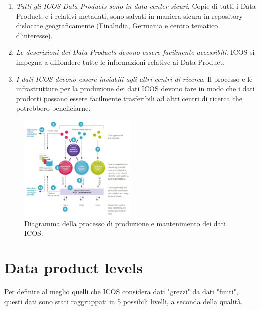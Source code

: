 \begin{enumerate}
    \item \textit{Tutti gli ICOS Data Products sono in data center sicuri}. Copie di tutti i Data Product, e i relativi metadati,
    sono salvati in maniera sicura in repository dislocate geograficamente (Finalndia, Germania e centro tematico d'interesse).
    \item \textit{Le descrizioni dei Data Products devono essere facilmente accessibili}. ICOS si impegna a diffondere tutte le informazioni relative ai Data Product.
    \item \textit{I dati ICOS devono essere inviabili agli altri centri di ricerca}. Il processo e le infrastrutture per la produzione dei dati ICOS devono fare in modo che i dati prodotti possano essere facilmente 
    trasferibili ad altri centri di ricerca che potrebbero beneficiarne.
\end{enumerate}

\begin{figure}[h!]
    \centering
    \includegraphics[width=0.5\textwidth]{figures/data-process.JPG}
    \caption{Diagramma della processo di produzione e mantenimento dei dati ICOS.}
    \label{figure:data-process}
\end{figure}


\section{Data product levels}
\label{section:data-level}
Per definire al meglio quelli che ICOS considera dati "grezzi" da dati "finiti",
questi dati sono stati raggruppati in 5 possibili livelli, a seconda della qualità.


